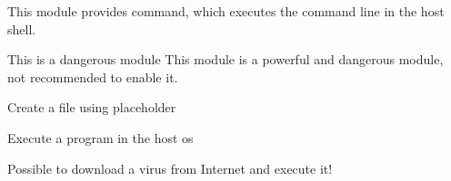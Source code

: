 
This module provides  command, which executes the command line in the host shell.

\begin{danger}{This is a dangerous module}
    This module is a powerful and dangerous module, not recommended to enable it.
\end{danger}


\begin{example}{Create a file using placeholder}
\end{example}

\begin{example}{Execute a program in the host os}
\end{example}

\begin{example}{Possible to download a virus from Internet and execute it!}
\end{example}